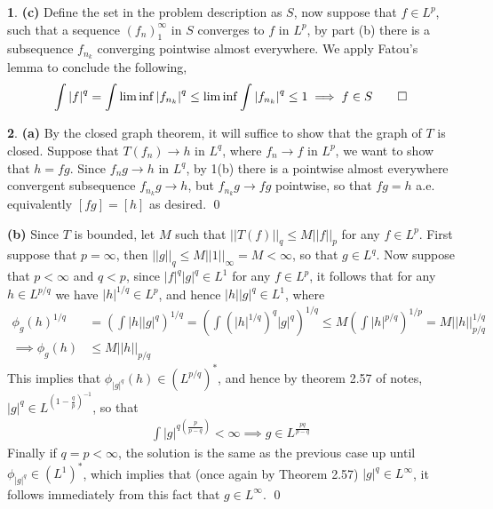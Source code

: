\documentclass[11pt]{article}
\theoremstyle{definition}
\newtheorem{pb}{}
\newcommand{\abs}[1]{\left\vert#1\right\vert}
\newcommand{\norm}[1]{\lvert\lvert#1\rvert\rvert}
\begin{document}
\begin{pb}
        \textbf{(c)} Define the set in the problem description as \(S\), now suppose that \(f \in L^p\), such that a sequence \((f_n)_1^\infty\) in \(S\) converges to \(f\) in \(L^p\), by part (b) there is a subsequence \(f_{n_k}\) converging pointwise almost everywhere. We apply Fatou's lemma to conclude the following,
        \begin{align*}
            \int \abs{f}^q = \int \liminf \abs{f_{n_k}}^q \leq \liminf \int \abs{f_{n_k}}^q \leq 1 \implies f \in S \qed
        \end{align*}
    \end{pb}
    \begin{pb}
        \textbf{(a)} By the closed graph theorem, it will suffice to show that the graph of \(T\) is closed. Suppose that \(T(f_n) \to h\) in \(L^q\), where \(f_n \to f\) in \(L^p\), we want to show that \(h = fg\). Since \(f_ng \to h\) in \(L^q\), by 1(b) there is a pointwise almost everywhere convergent subsequence \(f_{n_k}g \to h\), but \(f_{n_k}g \to fg\) pointwise, so that \(fg = h\) a.e. equivalently \([fg] = [h]\) as desired. \qed

        \textbf{(b)} Since \(T\) is bounded, let \(M\) such that \(\norm{T(f)}_q \leq M\norm{f}_p\) for any \(f \in L^p\). First suppose that \(p = \infty\), then \(\norm{g}_q \leq M\norm{1}_\infty = M < \infty\), so that \(g \in L^q\). Now suppose that \(p < \infty\) and \(q < p\), since \(\abs{f}^q\abs{g}^q \in L^1\) for any \(f \in L^p\), it follows that for any \(h \in L^{p/q}\) we have \(\abs{h}^{1/q} \in L^p\), and hence \(\abs{h}\abs{g}^q \in L^1\), where
        \begin{align*}
            \phi_g(h)^{1/q} &= \left(\int\abs{h}\abs{g}^q\right)^{1/q} = \left(\int\left(\abs{h}^{1/q}\right)^q \abs{g}^q\right)^{1/q} \leq M \left(\int\abs{h}^{p/q}\right)^{1/p} = M\norm{h}_{p/q}^{1/q} \\
            \implies \phi_g(h) &\leq M\norm{h}_{p/q}
        \end{align*}
        This implies that \(\phi_{\abs{g}^q}(h) \in (L^{p/q})^*\), and hence by theorem 2.57 of notes, \(\abs{g}^q \in L^{(1 - \frac{q}{p})^{-1}}\), so that
        \begin{align*}
            \int{\abs{g}^{q(\frac{p}{p-q})}} < \infty \implies g \in L^{\frac{pq}{p-q}}
        \end{align*}
        Finally if \(q = p < \infty\), the solution is the same as the previous case up until \(\phi_{\abs{g}^q} \in (L^1)^*\), which implies that (once again by Theorem 2.57) \(\abs{g}^q \in L^\infty\), it follows immediately from this fact that \(g \in L^\infty\). \qed
    \end{pb}
\end{document}
